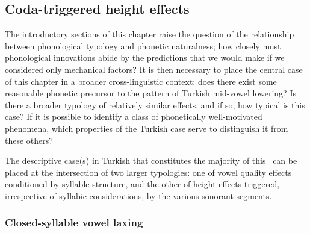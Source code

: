 \subsection{Coda-triggered height effects}\label{ss:coda_effects}

The introductory sections of this chapter raise the question of the relationship between phonological typology and phonetic naturalness; how closely must phonological innovations abide by the predictions that we would make if we considered only mechanical factors? It is then necessary to place the central case of this chapter in a broader cross-linguistic context: does there exist some reasonable phonetic precursor to the pattern of Turkish mid-vowel lowering? Is there a broader typology of relatively similar effects, and if so, how typical is this case? If it is possible to identify a class of phonetically well-motivated phenomena, which properties of the Turkish case serve to distinguish it from these others?

The descriptive case(s) in Turkish that constitutes the majority of this \instance \ can be placed at the intersection of two larger typologies: one of vowel quality effects conditioned by syllable structure, and the other of height effects triggered, irrespective of syllabic considerations, by the various sonorant segments.

\subsubsection{Closed-syllable vowel laxing}\label{sss:csvl}

